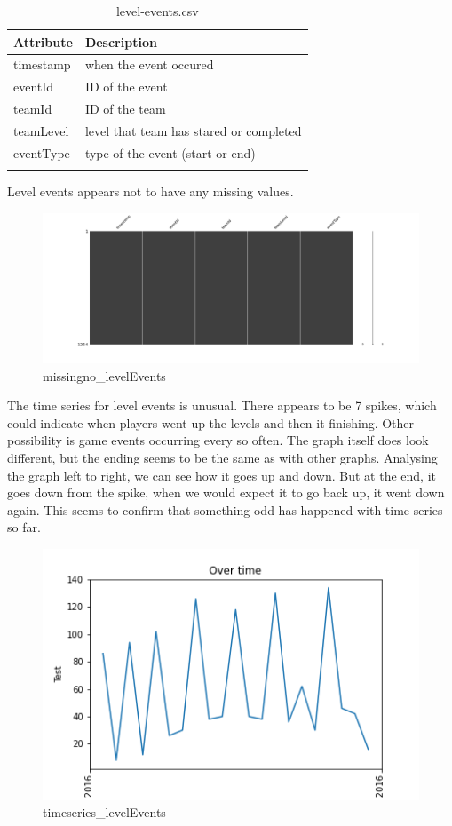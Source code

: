 \begin{center}
\begin{longtable}{ |l|l| } 
 \hline
 Attribute & Description\\ 
 \hline
 timestamp & when the event occured\\ 
 \hline
 eventId & ID of the event\\ 
 \hline
 teamId & ID of the team\\ 
 \hline
 teamLevel & level that team has stared or completed\\ 
 \hline
 eventType & type of the event (start or end)\\ 
 \hline
\caption{level-events.csv}
\end{longtable}
\end{center}

Level events appears not to have any missing values.
\begin{figure}[H]
\includegraphics[scale=0.25]{img/Graphs/levelEvents/missingno_levelEvents.png}
\centering
\caption{missingno\_levelEvents}
\label{fig:missingno_levelEvents}
\end{figure}

The time series for level events is unusual. There appears to be 7 spikes, which could indicate when players went up the levels and then it finishing. Other possibility is game events occurring every so often. The graph itself does look different, but the ending seems to be the same as with other graphs. Analysing the graph left to right, we can see how it goes up and down. But at the end, it goes down from the spike, when we would expect it to go back up, it went down again. This seems to confirm that something odd has happened with time series so far.
\begin{figure}[H]
\includegraphics[scale=0.85]{img/Graphs/levelEvents/timeseries_levelEvents.png}
\centering
\caption{timeseries\_levelEvents}
\label{fig:timeseries_levelEvents}
\end{figure}